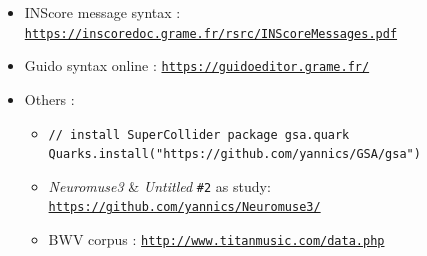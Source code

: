 \documentclass{article}
\begin{document}
\begin{itemize}[itemsep=0em]
\item INScore message syntax : \\ \href{https://inscoredoc.grame.fr/rsrc/INScoreMessages.pdf}{\texttt{\small https://inscoredoc.grame.fr/rsrc/INScoreMessages.pdf}}
\item Guido syntax online : \href{https://guidoeditor.grame.fr/}{\texttt{\small https://guidoeditor.grame.fr/}}
\item Others :
\vspace{-0.2cm}
\begin{itemize}[itemsep=0em]
\item \texttt{\small \textcolor{sccomment}{// install SuperCollider package gsa.quark}
	\\ \textcolor{scclass}{Quarks}.install(\textcolor{sclink}{"https://github.com/yannics/GSA/gsa"})}
\item \textsl{Neuromuse3} \& \textit{Untitled} \texttt{\#2} as study: \\ \href{https://github.com/yannics/Neuromuse3/}{\texttt{\small https://github.com/yannics/Neuromuse3/}}
\item BWV corpus : \href{http://www.titanmusic.com/data.php}{\texttt{\small http://www.titanmusic.com/data.php}}
\end{itemize}
\end{itemize}

\end{document}
